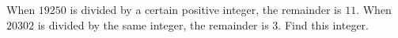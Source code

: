 When $19250$ is divided by a certain positive integer, the remainder is $11$. When $20302$ is divided by the same integer, the remainder is $3$. Find this integer.
